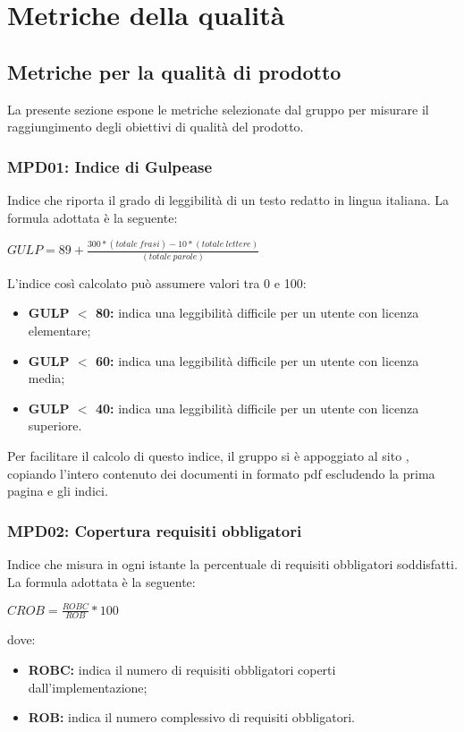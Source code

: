 \section{Metriche della qualità}
\subsection{Metriche per la qualità di prodotto}
La presente sezione espone le metriche selezionate dal gruppo \groupName{} per misurare il raggiungimento degli obiettivi di qualità del prodotto.

\subsubsection{MPD01: Indice di Gulpease}\label{sssec:indice_gulpease}
Indice che riporta il grado di leggibilità di un testo redatto in lingua italiana.
La formula adottata è la seguente:
\begin{center}
    $GULP = 89 + \displaystyle \frac{300*(totale\ frasi)-10*(totale\ lettere)}{(totale\ parole)}$
\end{center}
L'indice così calcolato può assumere valori tra 0 e 100:
\begin{itemize}
    \item \textbf{GULP $<$ 80:} indica una leggibilità difficile per un utente con licenza elementare;
    \item \textbf{GULP $<$ 60:} indica una leggibilità difficile per un utente con licenza media;
    \item \textbf{GULP $<$ 40:} indica una leggibilità difficile per un utente con licenza superiore.
\end{itemize}

Per facilitare il calcolo di questo indice, il gruppo si è appoggiato al sito \href{https://farfalla-project.org/readability_static/}, copiando
l'intero contenuto dei documenti in formato pdf escludendo la prima pagina e gli indici.

\subsubsection{MPD02: Copertura requisiti obbligatori}\label{sssec:requisiti_obbligatori}
Indice che misura in ogni istante la percentuale di requisiti obbligatori soddisfatti.
La formula adottata è la seguente:
\begin{center}
    $CROB = \displaystyle \frac{ROBC}{ROB}*100$
\end{center}
dove:
\begin{itemize}
    \item \textbf{ROBC:} indica il numero di requisiti obbligatori coperti dall'implementazione;
    \item \textbf{ROB:} indica il numero complessivo di requisiti obbligatori.
\end{itemize}

